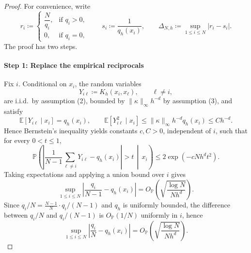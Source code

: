 \documentclass[10pt,a4paper]{amsart}
\begin{document}
\begin{proof}
For convenience, write
\begin{equation}
r_i\coloneq
\begin{cases}
\dfrac{N}{q_i}, & \text{if } q_i>0,\\[0.8ex]
0, & \text{if } q_i=0,
\end{cases}
\qquad
s_i\coloneq \frac{1}{q_h(x_i)},
\qquad
\Delta_{N,h}\coloneq \sup_{1\le i\le N}|r_i-s_i|.
\end{equation}
The proof has two steps.

\paragraph{Step 1: Replace the empirical reciprocals}
Fix $i$. Conditional on $x_i$, the random variables
\begin{equation}
Y_{i\ell}\coloneq K_h(x_i,x_\ell),
\qquad
\ell\neq i,
\end{equation}
are i.i.d.\ by assumption \textup{(2)}, bounded by $\|\kappa\|_\infty h^{-d}$ by assumption \textup{(3)}, and satisfy
\begin{equation}
\mathbb E[Y_{i\ell}\mid x_i]=q_h(x_i),
\qquad
\mathbb E[Y_{i\ell}^2\mid x_i]\le \|\kappa\|_\infty h^{-d}q_h(x_i)\le Ch^{-d}.
\end{equation}
Hence Bernstein's inequality yields constants $c,C>0$, independent of $i$, such that for every $0<t\le 1$,
\begin{equation}
\label{eq:conditional-bernstein}
\mathbb P\!\left(
\left|
\frac{1}{N-1}\sum_{\ell\neq i}Y_{i\ell}-q_h(x_i)
\right|>t \,\middle|\, x_i
\right)
\le
2\exp\!\left(-cNh^dt^2\right).
\end{equation}
Taking expectations and applying a union bound over $i$ gives
\begin{equation}
\label{eq:q-over-n-minus-one}
\sup_{1\le i\le N}
\left|
\frac{q_i}{N-1}-q_h(x_i)
\right|
=
O_{\mathbb P}\!\left(\sqrt{\frac{\log N}{N h^d}}\right).
\end{equation}
Since $q_i/N=\frac{N-1}{N}\cdot q_i/(N-1)$ and $q_h$ is uniformly bounded, the difference between $q_i/N$ and $q_i/(N-1)$ is $O_{\mathbb P}(1/N)$ uniformly in $i$, hence
\begin{equation}
\label{eq:q-over-n}
\sup_{1\le i\le N}
\left|
\frac{q_i}{N}-q_h(x_i)
\right|
=
O_{\mathbb P}\!\left(\sqrt{\frac{\log N}{N h^d}}\right).
\end{equation}


\end{proof}
\end{document}
